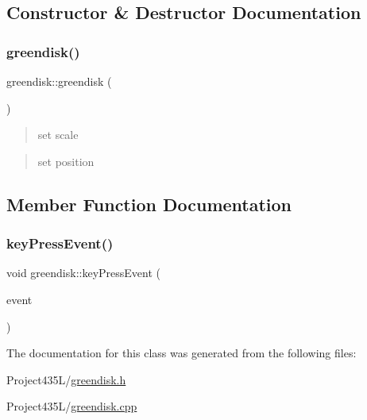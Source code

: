 \subsection{Constructor \& Destructor Documentation}
\mbox{\label{classgreendisk_a7b9300f93e1d6ec27bcd102b48d9d84d}} 
\subsubsection{\texorpdfstring{greendisk()}{greendisk()}}
{\footnotesize\ttfamily greendisk\+::greendisk (\begin{DoxyParamCaption}{ }\end{DoxyParamCaption})}

\begin{quote}
set scale \end{quote}


\begin{quote}
set position \end{quote}


\subsection{Member Function Documentation}
\mbox{\label{classgreendisk_a1764cd43a91d49bc95a7420122c33ed8}} 
\subsubsection{\texorpdfstring{key\+Press\+Event()}{keyPressEvent()}}
{\footnotesize\ttfamily void greendisk\+::key\+Press\+Event (\begin{DoxyParamCaption}\item[{Q\+Key\+Event $\ast$}]{event }\end{DoxyParamCaption})\hspace{0.3cm}{\ttfamily [inline]}}



The documentation for this class was generated from the following files\+:\begin{DoxyCompactItemize}
\item 
Project435\+L/\hyperlink{greendisk_8h}{greendisk.\+h}\item 
Project435\+L/\hyperlink{greendisk_8cpp}{greendisk.\+cpp}\end{DoxyCompactItemize}
